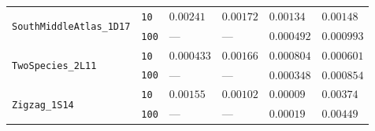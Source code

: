 \documentclass{article}
\begin{document}
\begin{footnotesize}
\begin{tabular}{llllll}
\cline{1-6}
\multirow[c]{2}{*}{\texttt{SouthMiddleAtlas\_1D17}} & \texttt{10} & $0.00241$ & $0.00172$ & $0.00134$ & $0.00148$ \\
 & \texttt{100} & --- & --- & $0.000492$ & $0.000993$ \\
\cline{1-6}
\multirow[c]{2}{*}{\texttt{TwoSpecies\_2L11}} & \texttt{10} & $0.000433$ & $0.00166$ & $0.000804$ & $0.000601$ \\
 & \texttt{100} & --- & --- & $0.000348$ & $0.000854$ \\
\cline{1-6}
\multirow[c]{2}{*}{\texttt{Zigzag\_1S14}} & \texttt{10} & $0.00155$ & $0.00102$ & $0.00009$ & $0.00374$ \\
 & \texttt{100} & --- & --- & $0.00019$ & $0.00449$ \\
\cline{1-6}
\bottomrule
\end{tabular}
\end{footnotesize}
\end{document}
